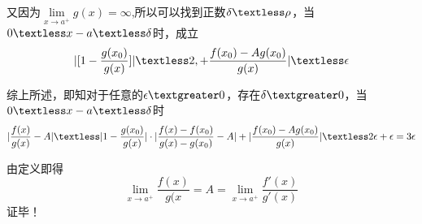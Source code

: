 \documentclass{ctexart}
\begin{document}
 又因为$\lim\limits_{x \to a^+}g(x)=\infty$,所以可以找到正数$\delta \textless \rho$，当$0\textless x-a\textless \delta$时，成立
 \[
|[1-\frac{g(x_0)}{g(x)}]|\textless 2,+\frac{f(x_0)-Ag(x_0)}{g(x)}|\textless \epsilon
 \]

 综上所述，即知对于任意的$\epsilon \textgreater 0$，存在$\delta \textgreater 0$，当$0 \textless x-a \textless \delta$时
 \[
 |\frac{f(x)}{g(x)}-A|\textless |1-\frac{g(x_0)}{g(x)}| \cdot | \frac{f(x)-f(x_0)}{g(x)-g(x_0)}-A|+|\frac{f(x_0)-Ag(x_0)}{g(x)}|\textless 2\epsilon+\epsilon=3\epsilon
 \]

 由定义即得
 \[
\lim\limits_{x \to a^+}\frac{f(x)}{g(x}=A=\lim\limits_{x \to a^+}\frac{f'(x)}{g'(x)}
 \]
   证毕！

 
\end{document}
